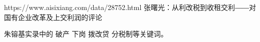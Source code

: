 https://www.aisixiang.com/data/28752.html
张曙光：从利改税到收租交利――对国有企业改革及上交利润的评论

朱镕基实录中的 破产 下岗 拨改贷 分税制等关键词。
